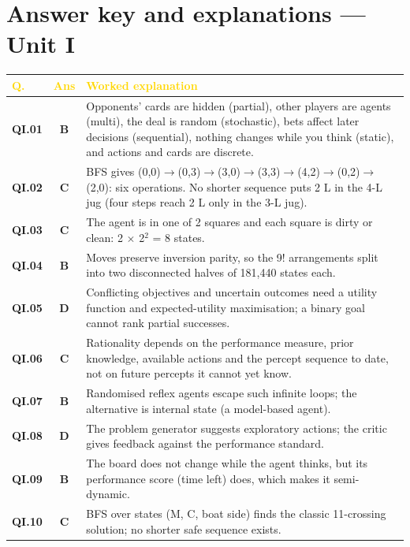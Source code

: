\documentclass[11pt]{article}
\begin{document}
\section*{Answer key and explanations --- Unit I}
\begin{longtable}{>{\leavevmode\bfseries\color{navy}}p{1.3cm} c p{13.2cm}}
\rowcolor{navy}\textcolor{gold}{\textbf{Q.}}&\textcolor{gold}{\textbf{Ans}}&\textcolor{gold}{\textbf{Worked explanation}}\\\endhead
QI.01&\textbf{\color{leaf}B}&Opponents' cards are hidden (partial), other players are agents (multi), the deal is random (stochastic), bets affect later decisions (sequential), nothing changes while you think (static), and actions and cards are discrete.\\
\rowcolor{ivory}QI.02&\textbf{\color{leaf}C}&BFS gives (0,0)$\to$(0,3)$\to$(3,0)$\to$(3,3)$\to$(4,2)$\to$(0,2)$\to$(2,0): six operations. No shorter sequence puts 2 L in the 4-L jug (four steps reach 2 L only in the 3-L jug).\\
QI.03&\textbf{\color{leaf}C}&The agent is in one of 2 squares and each square is dirty or clean: 2 $\times$ 2$^2$ = 8 states.\\
\rowcolor{ivory}QI.04&\textbf{\color{leaf}B}&Moves preserve inversion parity, so the 9! arrangements split into two disconnected halves of 181,440 states each.\\
QI.05&\textbf{\color{leaf}D}&Conflicting objectives and uncertain outcomes need a utility function and expected-utility maximisation; a binary goal cannot rank partial successes.\\
\rowcolor{ivory}QI.06&\textbf{\color{leaf}C}&Rationality depends on the performance measure, prior knowledge, available actions and the percept sequence to date, not on future percepts it cannot yet know.\\
QI.07&\textbf{\color{leaf}B}&Randomised reflex agents escape such infinite loops; the alternative is internal state (a model-based agent).\\
\rowcolor{ivory}QI.08&\textbf{\color{leaf}D}&The problem generator suggests exploratory actions; the critic gives feedback against the performance standard.\\
QI.09&\textbf{\color{leaf}B}&The board does not change while the agent thinks, but its performance score (time left) does, which makes it semi-dynamic.\\
\rowcolor{ivory}QI.10&\textbf{\color{leaf}C}&BFS over states (M, C, boat side) finds the classic 11-crossing solution; no shorter safe sequence exists.\\

\end{longtable}
\end{document}

